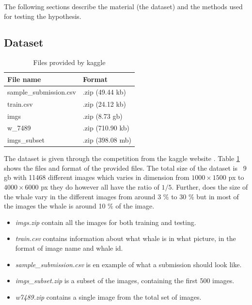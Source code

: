The following sections describe the material (the dataset) and the methods used for testing the hypothesis.

\subsection{Dataset}
\begin{table}
	\centering
	\caption{Files provided by kaggle}
	\label{table:dataset-files}
	\begin{tabular}{|l|l|}
		\hline
		File name              & Format           \\ \hline \hline
		sample\_submission.csv & .zip (49.44 kb)  \\ \hline
		train.csv              & .zip (24.12 kb)  \\ \hline
		imgs                   & .zip (8.73 gb)   \\ \hline
		w\_7489                & .zip (710.90 kb) \\ \hline
		imgs\_subset           & .zip (398.08 mb) \\ \hline
	\end{tabular}
\end{table}

The dataset is given through the competition from the kaggle website \cite{kaggle:competition}. Table \ref{table:dataset-files} shows the files and format of the provided files. The total size of the dataset is ~9 gb with 11468 different images which varies in dimension from \(1000 \times 1500\) px to \(4000 \times 6000\) px they do however all have the ratio of \(1/5\).
Further, does the size of the whale vary in the different images from around 3 \% to 30 \% but in most of the images the whale is around 10 \% of the image.

\begin{itemize}
	\item \emph{imgs.zip} contain all the images for both training and testing.
	\item \emph{train.csv} contains information about what whale is in what picture, in the format of image name and whale id.
	\item \emph{sample\_submission.csv} is en example of what a submission should look like.
	\item \emph{imgs\_subset.zip} is a subset of the images, containing the first 500 images.
	\item \emph{w\-7489.zip} contains a single image from the total set of images.
\end{itemize}

